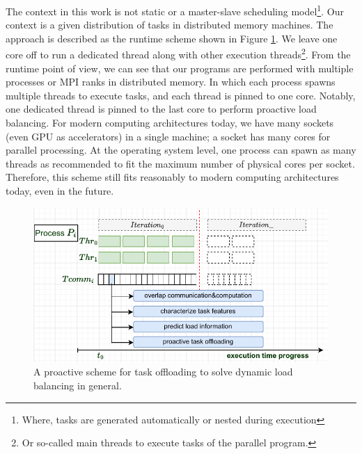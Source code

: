 The context in this work is not static or a master-slave scheduling model\footnote{Where, tasks are generated automatically or nested during execution}. Our context is a given distribution of tasks in distributed memory machines. The approach is described as the runtime scheme shown in Figure \ref{fig:padlb_proact_scheme}. We leave one core off to run a dedicated thread along with other execution threads\footnote{Or so-called main threads to execute tasks of the parallel program.}. From the runtime point of view, we can see that our programs are performed with multiple processes or MPI ranks in distributed memory. In which each process spawns multiple threads to execute tasks, and each thread is pinned to one core. Notably, one dedicated thread is pinned to the last core to perform proactive load balancing. For modern computing architectures today, we have many sockets (even GPU as accelerators) in a single machine; a socket has many cores for parallel processing. At the operating system level, one process can spawn as many threads as recommended to fit the maximum number of physical cores per socket. Therefore, this scheme still fits reasonably to modern computing architectures today, even in the future.\\


\begin{figure}[t]
	\centering
	\includegraphics[scale=0.7]{./pictures/padlb_approach/padlb_proact_scheme.pdf}
	\caption{A proactive scheme for task offloading to solve dynamic load balancing in general.}
	\label{fig:padlb_proact_scheme}
\end{figure}

